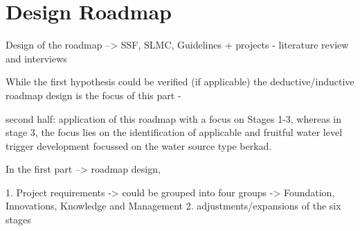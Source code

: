 \section{Design Roadmap}

% 




Design of the roadmap --> SSF, SLMC, Guidelines + projects - literature review and interviews

While the first hypothesis could be verified (if applicable) the deductive/inductive roadmap design is the focus of this part -

second half: application of this roadmap with a focus on Stages 1-3, whereas in stage 3, the focus lies on the identification of applicable and fruitful water level trigger development focussed on the water source type berkad.  


In the first part
--> roadmap design, 

1. Project requirements -> could be grouped into four groups -> Foundation, Innovations, Knowledge and Management 
2. adjustments/expansions of the six stages


